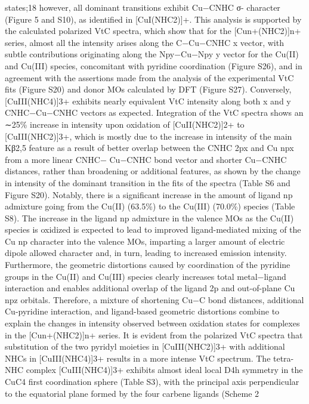 \documentclass{article}
\begin{document}
states;18 however, all dominant transitions exhibit Cu−CNHC σ-
character (Figure 5 and S10), as identiﬁed in [CuI(NHC2)]+.
This analysis is supported by the calculated polarized VtC
spectra, which show that for the [Cun+(NHC2)]n+ series,
almost all the intensity arises along the C−Cu−CNHC x vector,
with subtle contributions originating along the Npy−Cu−Npy y
vector for the Cu(II) and Cu(III) species, concomitant with
pyridine coordination (Figure S26), and in agreement with the
assertions made from the analysis of the experimental VtC ﬁts
(Figure S20) and donor MOs calculated by DFT (Figure S27).
Conversely, [CuIII(NHC4)]3+ exhibits nearly equivalent VtC
intensity along both x and y CNHC−Cu−CNHC vectors as
expected.
Integration of the VtC spectra shows an ∼25\% increase in
intensity
upon
oxidation
of
[CuII(NHC2)]2+
to
[CuIII(NHC2)]3+, which is mostly due to the increase in
intensity of the main Kβ2,5 feature as a result of better overlap
between the CNHC 2px and Cu npx from a more linear CNHC−
Cu−CNHC bond vector and shorter Cu−CNHC distances, rather
than broadening or additional features, as shown by the change
in intensity of the dominant transition in the ﬁts of the spectra
(Table S6 and Figure S20). Notably, there is a signiﬁcant
increase in the amount of ligand np admixture going from the
Cu(II) (63.5\%) to the Cu(III) (70.0\%) species (Table S8).
The increase in the ligand np admixture in the valence MOs as
the Cu(II) species is oxidized is expected to lead to improved
ligand-mediated mixing of the Cu np character into the valence
MOs, imparting a larger amount of electric dipole allowed
character and, in turn, leading to increased emission intensity.
Furthermore, the geometric distortions caused by coordination
of the pyridine groups in the Cu(II) and Cu(III) species
clearly increases total metal−ligand interaction and enables
additional overlap of the ligand 2p and out-of-plane Cu npz
orbitals. Therefore, a mixture of shortening Cu−C bond
distances, additional Cu-pyridine interaction, and ligand-based
geometric distortions combine to explain the changes in
intensity observed between oxidation states for complexes in
the [Cun+(NHC2)]n+ series.
It is evident from the polarized VtC spectra that substitution
of the two pyridyl moieties in [CuIII(NHC2)]3+ with additional
NHCs in [CuIII(NHC4)]3+ results in a more intense VtC
spectrum. The tetra-NHC complex [CuIII(NHC4)]3+ exhibits
almost ideal local D4h symmetry in the CuC4 ﬁrst coordination
sphere (Table S3), with the principal axis perpendicular to the
equatorial plane formed by the four carbene ligands (Scheme 2
\end{document}
